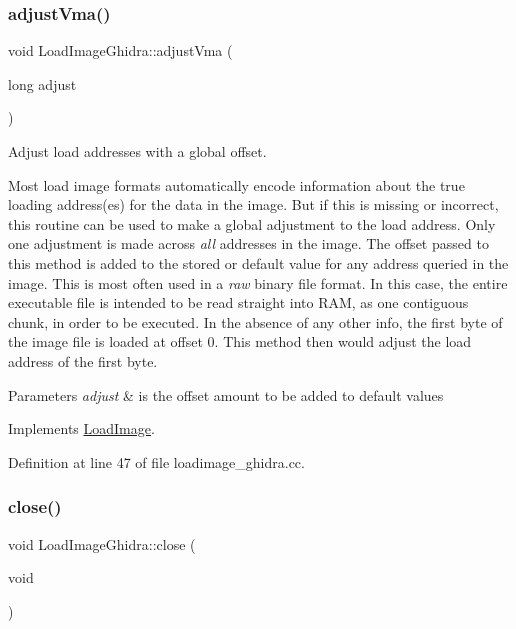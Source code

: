 \subsubsection{\texorpdfstring{adjustVma()}{adjustVma()}}
{\footnotesize\ttfamily void Load\+Image\+Ghidra\+::adjust\+Vma (\begin{DoxyParamCaption}\item[{long}]{adjust }\end{DoxyParamCaption})\hspace{0.3cm}{\ttfamily [virtual]}}



Adjust load addresses with a global offset. 

Most load image formats automatically encode information about the true loading address(es) for the data in the image. But if this is missing or incorrect, this routine can be used to make a global adjustment to the load address. Only one adjustment is made across {\itshape all} addresses in the image. The offset passed to this method is added to the stored or default value for any address queried in the image. This is most often used in a {\itshape raw} binary file format. In this case, the entire executable file is intended to be read straight into R\+AM, as one contiguous chunk, in order to be executed. In the absence of any other info, the first byte of the image file is loaded at offset 0. This method then would adjust the load address of the first byte. 
\begin{DoxyParams}{Parameters}
{\em adjust} & is the offset amount to be added to default values \\
\hline
\end{DoxyParams}


Implements \mbox{\hyperlink{class_load_image_a51a254f705fba6f0e6524995acd5aaa7}{Load\+Image}}.



Definition at line 47 of file loadimage\+\_\+ghidra.\+cc.

\mbox{\label{class_load_image_ghidra_acf4fe0d15e10fc48c52438810a1d7cdf}} 
\subsubsection{\texorpdfstring{close()}{close()}}
{\footnotesize\ttfamily void Load\+Image\+Ghidra\+::close (\begin{DoxyParamCaption}\item[{void}]{ }\end{DoxyParamCaption})}



